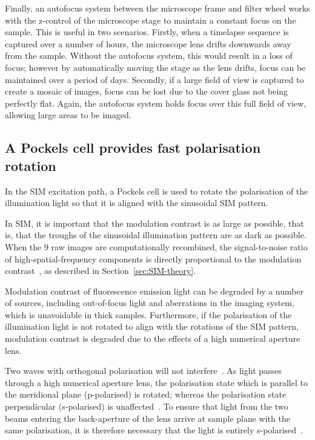 Finally, an autofocus system between the microscope frame and filter wheel works with the z-control of the microscope stage to maintain a constant focus on the sample.
This is useful in two scenarios.
Firstly, when a timelapse sequence is captured over a number of hours, the microscope lens drifts downwards away from the sample.
Without the autofocus system, this would result in a loss of focus; however by automatically moving the stage as the lens drifts, focus can be maintained over a period of days.
Secondly, if a large field of view is captured to create a mosaic of images, focus can be lost due to the cover glass not being perfectly flat.
Again, the autofocus system holds focus over this full field of view, allowing large areas to be imaged.


\subsection{A Pockels cell provides fast polarisation rotation} \label{sec:lagsim-pockels}
In the SIM excitation path, a Pockels cell is used to rotate the polarisation of the illumination light so that it is aligned with the sinusoidal SIM pattern.

In SIM, it is important that the modulation contrast is as large as possible, that is, that the troughs of the sinusoidal illumination pattern are as dark as possible.
When the 9 raw images are computationally recombined, the signal-to-noise ratio of high-spatial-frequency components is directly proportional to the modulation contrast~\cite{oholleran2012polarization}, as described in Section~\ref{sec:SIM-theory}.

Modulation contrast of fluorescence emission light can be degraded by a number of sources, including out-of-focus light and aberrations in the imaging system, which is unavoidable in thick samples.
Furthermore, if the polarisation of the illumination light is not rotated to align with the rotations of the SIM pattern,  modulation contrast is degraded due to the effects of a high numerical aperture lens.

Two waves with orthogonal polarisation will not interfere~\cite{nityananda2013interference}.
As light passes through a high numerical aperture lens, the polarisation state which is parallel to the meridional plane (p-polarised) is rotated; whereas the polarisation state perpendicular (s-polarised) is unaffected~\cite{mansuripur1991effects}.
To ensure that light from the two beams entering the back-aperture of the lens arrive at sample plane with the same polarisation, it is therefore necessary that the light is entirely s-polarised~\cite{oholleran2012polarization}.

